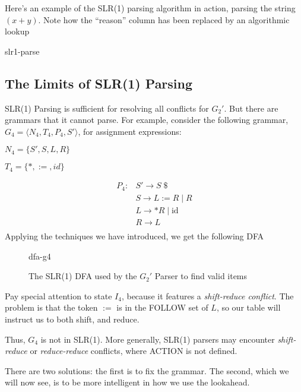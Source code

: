 Here's an example of the SLR(1) parsing algorithm in action, parsing the string $(x+y)$. Note how the ``reason'' column has been replaced by an algorithmic lookup 
\begin{center}
    {slr1-parse}
\end{center}

\subsection{The Limits of SLR(1) Parsing}
SLR(1) Parsing is sufficient for resolving all conflicts for $G_2'$. But there are grammars that it cannot parse. For example, consider the following grammar, $G_4 = \langle N_4, T_4, P_4, S' \rangle$, for assignment expressions:
\begin{minipage}[t]{0.5\textwidth}
\begin{center}
$N_4 = \{ S', S, L, R \}$
\end{center}
\end{minipage}%
\begin{minipage}[t]{0.5\textwidth}
\begin{center}
$T_4 = \{ *,:=,id\}$
\end{center}
\end{minipage}

\[
\begin{array}{ll}
  P_4: & S' \to S\; \$ \\
&   S \to L := R \mid R \\
&   L \to * R \mid \text{id} \\
&   R \to L\\
\end{array}
\]
Applying the techniques we have introduced, we get the following DFA
\begin{figure}[H]
    \centering
    {dfa-g4}
    \caption{The SLR(1) DFA used by the $G_2'$ Parser to find valid items}
    \label{fig:dfa-g4}
\end{figure}

Pay special attention to state $I_4$, because it features a \textit{shift-reduce conflict}. The problem is that the token $:=$ is in the FOLLOW set of $L$, so our table will instruct us to both shift, and reduce. 

Thus, $G_4$ is not in SLR(1). More generally, SLR(1) parsers may encounter \textit{shift-reduce} or \textit{reduce-reduce} conflicts, where ACTION is not defined. 

There are two solutions: the first is to fix the grammar. The second, which we will now see, is to be more intelligent in how we use the lookahead. 

